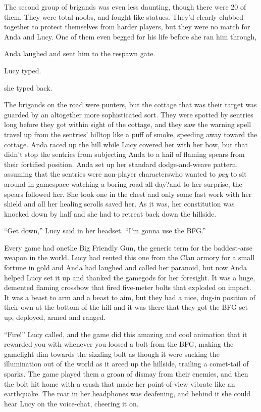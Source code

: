 The second group of brigands was even less daunting, though there
were 20 of them. They were total noobs, and fought like statues.
They’d clearly clubbed together to protect themselves from harder
players, but they were no match for Anda and Lucy. One of them even
begged for his life before she ran him through,

Anda laughed and sent him to the respawn gate.

Lucy typed.

she typed back.

\tb

The brigands on the road were punters, but the cottage that was
their target was guarded by an altogether more sophisticated sort.
They were spotted by sentries long before they got within sight of
the cottage, and they saw the warning spell travel up from the
sentries’ hilltop like a puff of smoke, speeding away toward the
cottage. Anda raced up the hill while Lucy covered her with her
bow, but that didn’t stop the sentries from subjecting Anda to a
hail of flaming spears from their fortified position. Anda set up
her standard dodge-and-weave pattern, assuming that the sentries
were non-player characters\dash{}who wanted to \emph{pay} to sit around
in gamespace watching a boring road all day?\dash{}and to her surprise,
the spears followed her. She took one in the chest and only some
fast work with her shield and all her healing scrolls saved her. As
it was, her constitution was knocked down by half and she had to
retreat back down the hillside.

“Get down,” Lucy said in her headset. “I’m gonna use the BFG.”

Every game had one\dash{}the Big Friendly Gun, the generic term for the
baddest-arse weapon in the world. Lucy had rented this one from the
Clan armory for a small fortune in gold and Anda had laughed and
called her paranoid, but now Anda helped Lucy set it up and thanked
the gamegods for her foresight. It was a huge, demented flaming
crossbow that fired five-meter bolts that exploded on impact. It
was a beast to arm and a beast to aim, but they had a nice, dug-in
position of their own at the bottom of the hill and it was there
that they got the BFG set up, deployed, armed and ranged.

“Fire!” Lucy called, and the game did this amazing and cool
animation that it rewarded you with whenever you loosed a bolt from
the BFG, making the gamelight dim towards the sizzling bolt as
though it were sucking the illumination out of the world as it
arced up the hillside, trailing a comet-tail of sparks. The game
played them a groan of dismay from their enemies, and then the bolt
hit home with a crash that made her point-of-view vibrate like an
earthquake. The roar in her headphones was deafening, and behind it
she could hear Lucy on the voice-chat, cheering it on.

